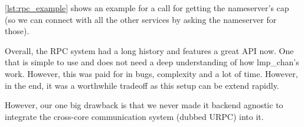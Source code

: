 \autoref{lst:rpc_example} shows an example for a call for getting the 
nameserver's cap (so we can connect with all the other services by asking the 
nameserver for those).
\medskip

Overall, the RPC system had a long history and features a great API now. One that is  simple to use 
and does not need a deep understanding of how lmp\_chan's work. However, this 
was paid for in bugs, complexity and a lot of time. However, in the end, it was a worthwhile 
tradeoff as this setup can be extend rapidly.
\medskip

However, our one big drawback is that we never made it backend agnostic to integrate 
the cross-core communication system (dubbed URPC) into it.
